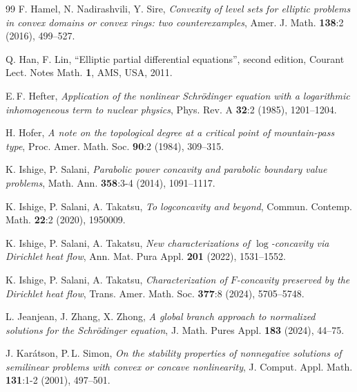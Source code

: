 \documentclass[12pt]{amsart}
\numberwithin{equation}{section}
\theoremstyle{plain}
\theoremstyle{plain}
\theoremstyle{plain}
\theoremstyle{definition}
\begin{document}
\begin{thebibliography}{99}
F. Hamel, N. Nadirashvili, Y. Sire, 
\emph{Convexity of level sets for elliptic problems in convex domains or convex rings: two counterexamples},
Amer. J. Math. \textbf{138}:2 (2016), 499--527.

Q. Han, F. Lin, 
``Elliptic partial differential equations'', 
second edition, Courant Lect. Notes Math. \textbf{1}, AMS, USA, 2011.


E.$\,$F. Hefter,
\emph{Application of the nonlinear Schrödinger equation with a logarithmic inhomogeneous term to nuclear physics},
Phys. Rev. A \textbf{32}:2 (1985), 1201--1204.



H. Hofer,
\emph{A note on the topological degree at a critical point of mountain-pass type},
Proc. Amer. Math. Soc. \textbf{90}:2 (1984), 309--315.


K. Ishige, P. Salani, 
\emph{Parabolic power concavity and parabolic boundary value problems},
Math. Ann. \textbf{358}:3-4 (2014), 1091--1117.

K. Ishige, P. Salani, A. Takatsu, 
\emph{To logconcavity and beyond}, 
Commun. Contemp. Math. \textbf{22}:2 (2020), 1950009.

K. Ishige, P. Salani, A. Takatsu,
\emph{New characterizations of $\log$-concavity via Dirichlet heat flow},
 Ann. Mat. Pura Appl. \textbf{201} (2022), 1531--1552.

K. Ishige, P. Salani, A. Takatsu,
\emph{Characterization of $F$-concavity preserved by the Dirichlet heat flow},
Trans. Amer. Math. Soc. \textbf{377}:8 (2024), 5705--5748.

L. Jeanjean, J. Zhang, X. Zhong,
\emph{A global branch approach to normalized solutions for the Schrödinger equation},
J. Math. Pures Appl. \textbf{183} (2024), 44--75.

J. Karátson, P.$\,$L. Simon,
\emph{On the stability properties of nonnegative solutions of semilinear problems with convex or concave nonlinearity},
J. Comput. Appl. Math. \textbf{131}:1-2 (2001), 497--501.


\end{thebibliography}
\end{document}
